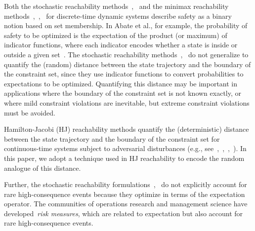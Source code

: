 \documentclass[letterpaper, 10 pt, conference]{ieeeconf}  %
\begin{document}
Both the stochastic reachability methods~\cite{abate2008probabilistic},~\cite{summers2010verification} and the minimax reachability methods~\cite{bertsekas1971control},~\cite{bertsekas1971minimax},~\cite{bertsekas2005dynamic} for discrete-time dynamic systems
describe safety as a binary notion based on set membership.
In Abate et al., for example, the probability of safety to be optimized is the expectation of the product (or maximum)
of indicator functions, where each indicator encodes whether a state is inside or outside a given set~\cite{abate2008probabilistic}.
The stochastic reachability methods~\cite{abate2008probabilistic},~\cite{summers2010verification} 
do not generalize to quantify the (random) distance between the state trajectory and the boundary of the constraint set,
since they use indicator functions to convert probabilities to expectations to be optimized.
Quantifying this distance may be important in applications where the boundary of the constraint set is not known exactly, 
or where mild constraint violations are inevitable, but extreme constraint violations must be avoided.

Hamilton-Jacobi (HJ) reachability methods quantify the (deterministic) distance between the state trajectory and the boundary of the constraint set
for continuous-time systems subject to adversarial disturbances (e.g., see~\cite{bansal2017hamilton},~\cite{herbert2017fastrack},~\cite{EECS-2018-41},~\cite{mitchell2005toolbox}).
In this paper, we adopt a technique used in HJ reachability to encode the random analogue of this distance.


Further, the stochastic reachability formulations~\cite{abate2008probabilistic},~\cite{summers2010verification} 
do not explicitly account for rare high-consequence events because they optimize in terms of the expectation operator.
The communities of operations research and management science have developed~\textit{risk measures}, which are related to expectation 
but also account for rare high-consequence events. 
\end{document}
